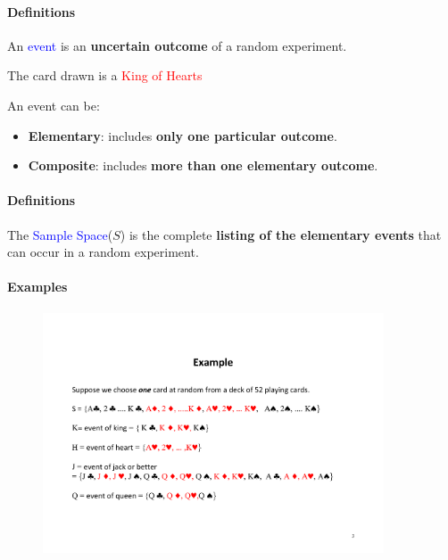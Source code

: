 \documentclass[notes=show]{beamer}\usepackage[]{graphicx}\usepackage[]{color}
\begin{document}
\begin{frame}{\secname}
  \framesubtitle{Definitions}
  \begin{definition}
  An \textcolor{blue}{event} is an \textbf{uncertain outcome} of a random experiment.
  \end{definition}
  \pause
  \begin{example}
    \begin{center}
    The card drawn is a \textcolor{red}{King of Hearts}
    \end{center}
  \end{example}
  \pause
  An event can be:
  \begin{itemize}
  \item \textbf{Elementary}: includes \textbf{only one particular outcome}.
  \item \textbf{Composite}: includes \textbf{more than one elementary outcome}.
  \end{itemize}
\end{frame}

\begin{frame}{\secname}
\framesubtitle{Definitions}
  \begin{definition}
  The \textcolor{blue}{Sample Space}($S$) is the complete \textbf{listing of the elementary events} that can occur in a random experiment.
  \end{definition}
\end{frame}

\begin{frame}{\secname}
\framesubtitle{Examples}
  \begin{example}
  \begin{figure}[h!]
  \centering
  \includegraphics[width=0.9\textwidth,height=0.55\textheight]{img/Example1_GE.pdf}
  \end{figure}
  \end{example}
\end{frame}
\end{document}
